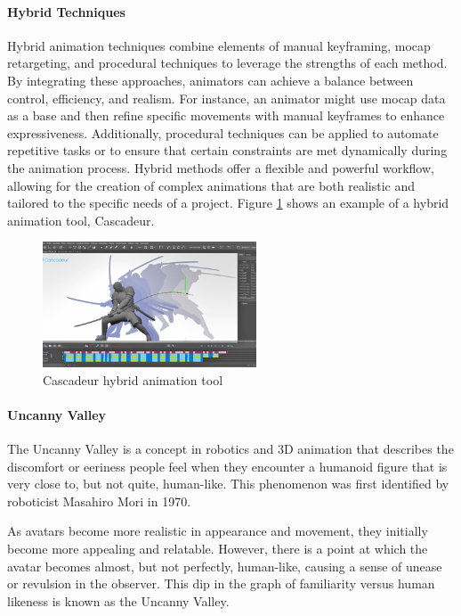 \documentclass[../../main.tex]{subfiles}
\begin{document}
\paragraph{Hybrid Techniques}
\label{par:hybrid_techniques}

Hybrid animation techniques combine elements of manual keyframing, mocap retargeting, and procedural techniques to leverage the strengths of each method. By integrating these approaches, animators can achieve a balance between control, efficiency, and realism. For instance, an animator might use mocap data as a base and then refine specific movements with manual keyframes to enhance expressiveness. Additionally, procedural techniques can be applied to automate repetitive tasks or to ensure that certain constraints are met dynamically during the animation process. Hybrid methods offer a flexible and powerful workflow, allowing for the creation of complex animations that are both realistic and tailored to the specific needs of a project. Figure \ref{fig:cascadeur} shows an example of a hybrid animation tool, Cascadeur.

\begin{figure} 
  \centering \includegraphics[width = 2.5in]{chapters/background_work/images/cascadeur.png} 
  \caption{Cascadeur hybrid animation tool} 
  \label{fig:cascadeur} 
\end{figure}

\paragraph{Uncanny Valley}
\label{par:uncanny_valley}

The Uncanny Valley is a concept in robotics and 3D animation that describes the discomfort or eeriness people feel when they encounter a humanoid figure that is very close to, but not quite, human-like. This phenomenon was first identified by roboticist Masahiro Mori in 1970.

As avatars become more realistic in appearance and movement, they initially become more appealing and relatable. However, there is a point at which the avatar becomes almost, but not perfectly, human-like, causing a sense of unease or revulsion in the observer. This dip in the graph of familiarity versus human likeness is known as the Uncanny Valley.
\end{document}
